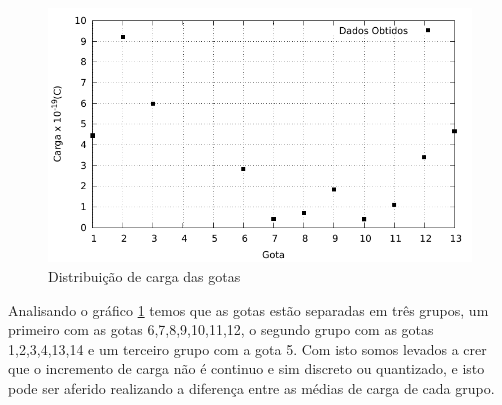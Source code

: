 \begin{figure}[!htb]
	\centering
		\includegraphics[scale= 1]{grafico/gotas.pdf}
	\caption{Distribuição de carga das gotas}
	\label{im:Car}
\end{figure}


Analisando o gráfico \ref{im:Car} temos que as gotas estão separadas em três grupos, um primeiro com as gotas 6,7,8,9,10,11,12, o segundo grupo com as gotas 1,2,3,4,13,14 e um terceiro grupo com a gota 5. Com isto somos levados a crer que o incremento de carga não é continuo e sim discreto ou quantizado, e isto pode ser aferido realizando a diferença entre as médias de carga de cada grupo.


